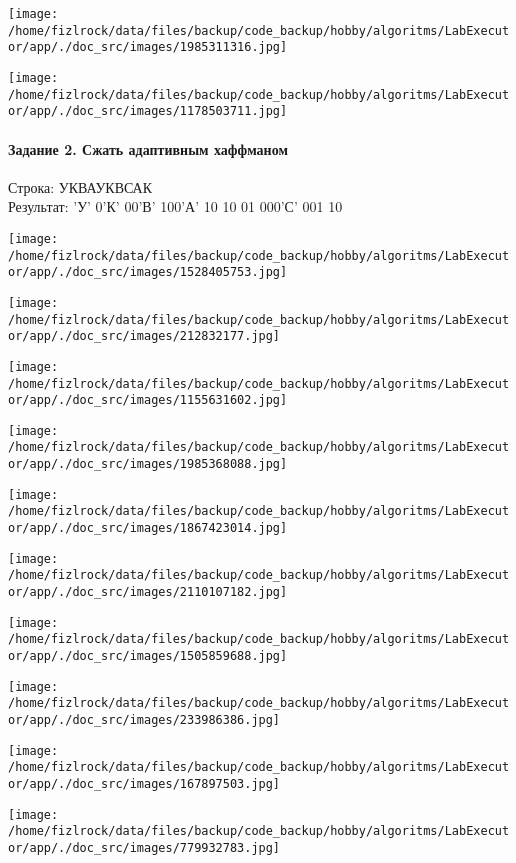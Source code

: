 \documentclass[a4paper, 12pt]{article}
\begin{document}
\texttt{[image: /home/fizlrock/data/files/backup/code\_backup/hobby/algoritms/LabExecutor/app/./doc\_src/images/1985311316.jpg]}

\texttt{[image: /home/fizlrock/data/files/backup/code\_backup/hobby/algoritms/LabExecutor/app/./doc\_src/images/1178503711.jpg]}
\pagebreak
\paragraph{Задание 2. Сжать адаптивным хаффманом\\}

Строка: 
УКВАУКВСАК\\
Результат: 'У' 0'К' 00'В' 100'А' 10 10 01 000'С' 001 10

\texttt{[image: /home/fizlrock/data/files/backup/code\_backup/hobby/algoritms/LabExecutor/app/./doc\_src/images/1528405753.jpg]}

\texttt{[image: /home/fizlrock/data/files/backup/code\_backup/hobby/algoritms/LabExecutor/app/./doc\_src/images/212832177.jpg]}

\texttt{[image: /home/fizlrock/data/files/backup/code\_backup/hobby/algoritms/LabExecutor/app/./doc\_src/images/1155631602.jpg]}

\texttt{[image: /home/fizlrock/data/files/backup/code\_backup/hobby/algoritms/LabExecutor/app/./doc\_src/images/1985368088.jpg]}

\texttt{[image: /home/fizlrock/data/files/backup/code\_backup/hobby/algoritms/LabExecutor/app/./doc\_src/images/1867423014.jpg]}

\texttt{[image: /home/fizlrock/data/files/backup/code\_backup/hobby/algoritms/LabExecutor/app/./doc\_src/images/2110107182.jpg]}

\texttt{[image: /home/fizlrock/data/files/backup/code\_backup/hobby/algoritms/LabExecutor/app/./doc\_src/images/1505859688.jpg]}

\texttt{[image: /home/fizlrock/data/files/backup/code\_backup/hobby/algoritms/LabExecutor/app/./doc\_src/images/233986386.jpg]}

\texttt{[image: /home/fizlrock/data/files/backup/code\_backup/hobby/algoritms/LabExecutor/app/./doc\_src/images/167897503.jpg]}

\texttt{[image: /home/fizlrock/data/files/backup/code\_backup/hobby/algoritms/LabExecutor/app/./doc\_src/images/779932783.jpg]}
\pagebreak
\end{document}
